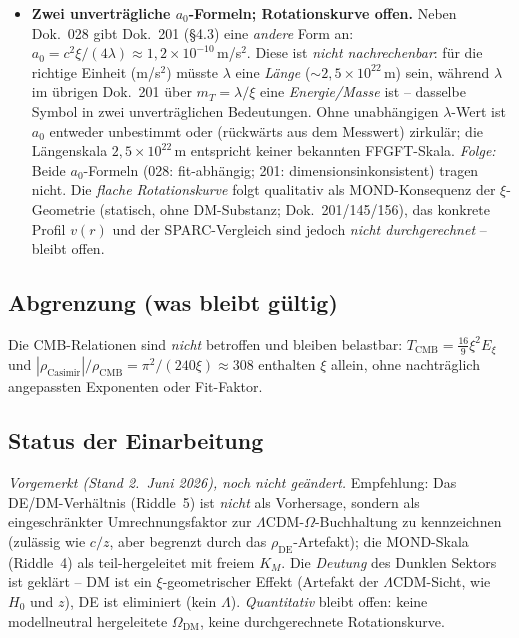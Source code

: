\begin{itemize}
        parameterfrei.
  \item \textbf{Zwei unverträgliche $a_0$-Formeln; Rotationskurve offen.}
        Neben Dok.~028 gibt Dok.~201 (§4.3) eine \emph{andere} Form an:
        $a_0 = c^2\xi/(4\lambda)\approx 1{,}2\times10^{-10}$\,m/s$^2$. Diese ist
        \emph{nicht nachrechenbar}: für die richtige Einheit (m/s$^2$) müsste
        $\lambda$ eine \emph{Länge} ($\sim 2{,}5\times10^{22}$\,m) sein, während
        $\lambda$ im übrigen Dok.~201 über $m_T=\lambda/\xi$ eine
        \emph{Energie/Masse} ist -- dasselbe Symbol in zwei unverträglichen
        Bedeutungen. Ohne unabhängigen $\lambda$-Wert ist $a_0$ entweder
        unbestimmt oder (rückwärts aus dem Messwert) zirkulär; die Längenskala
        $2{,}5\times10^{22}$\,m entspricht keiner bekannten FFGFT-Skala.
        \emph{Folge:} Beide $a_0$-Formeln (028: fit-abhängig; 201:
        dimensionsinkonsistent) tragen nicht. Die \emph{flache Rotationskurve}
        folgt qualitativ als MOND-Konsequenz der $\xi$-Geometrie (statisch,
        ohne DM-Substanz; Dok.~201/145/156), das konkrete Profil $v(r)$ und der
        SPARC-Vergleich sind jedoch \emph{nicht durchgerechnet} -- bleibt offen.
\end{itemize}

\subsection*{Abgrenzung (was bleibt gültig)}

Die CMB-Relationen sind \emph{nicht} betroffen und bleiben belastbar:
$T_{\text{CMB}} = \tfrac{16}{9}\xi^2 E_\xi$ und
$|\rho_{\text{Casimir}}|/\rho_{\text{CMB}} = \pi^2/(240\xi) \approx 308$
enthalten $\xi$ allein, ohne nachträglich angepassten Exponenten oder
Fit-Faktor.

\subsection*{Status der Einarbeitung}

\emph{Vorgemerkt (Stand 2.~Juni 2026), noch nicht geändert.} Empfehlung: Das
DE/DM-Verhältnis (Riddle~5) ist \emph{nicht} als Vorhersage, sondern als
eingeschränkter Umrechnungsfaktor zur $\Lambda$CDM-$\Omega$-Buchhaltung zu
kennzeichnen (zulässig wie $c/z$, aber begrenzt durch das $\rho_{\text{DE}}$-Artefakt);
die MOND-Skala (Riddle~4) als teil-hergeleitet mit freiem $K_M$. Die
\emph{Deutung} des Dunklen Sektors ist geklärt -- DM ist ein $\xi$-geometrischer
Effekt (Artefakt der $\Lambda$CDM-Sicht, wie $H_0$ und $z$), DE ist eliminiert
(kein $\Lambda$). \emph{Quantitativ} bleibt offen: keine modellneutral
hergeleitete $\Omega_{\text{DM}}$, keine durchgerechnete Rotationskurve.

